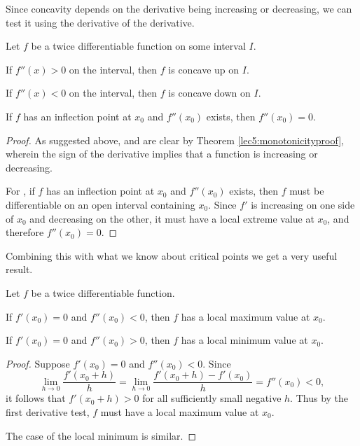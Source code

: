 \noindent
Since concavity depends on the derivative being increasing or decreasing, we can test it using the derivative of the derivative.

\begin{theorem}
	Let $f$ be a twice differentiable function on some interval $I$.
	\begin{romanlist}
		\item If $f''(x) > 0$ on the interval, then $f$ is concave up on $I$.
		\item If $f''(x) < 0$ on the interval, then $f$ is concave down on $I$.
		\item If $f$ has an inflection point at $x_0$ and $f''(x_0)$ exists, then $f''(x_0) = 0$.
	\end{romanlist}
\end{theorem}

\begin{proof}
	As suggested above,  and  are clear by Theorem \ref{lec5:monotonicityproof}, wherein the sign of the derivative implies that a function is increasing or decreasing.

	For , if $f$ has an inflection point at $x_0$ and $f''(x_0)$ exists, then $f$ must be differentiable on an open interval containing $x_0$.
	Since $f'$ is increasing on one side of $x_0$ and decreasing on the other, it must have a local extreme value at $x_0$, and therefore $f''(x_0) = 0$.
\end{proof}

\noindent
Combining this with what we know about critical points we get a very useful result.

\begin{theorem}
	Let $f$ be a twice differentiable function.

	\begin{romanlist}
		\item If $f'(x_0) = 0$ and $f''(x_0) < 0$, then $f$ has a local maximum value at $x_0$.
		\item If $f'(x_0) = 0$ and $f''(x_0) > 0$, then $f$ has a local minimum value at $x_0$.
	\end{romanlist}
\end{theorem}

\begin{proof}
	Suppose $f'(x_0) = 0$ and $f''(x_0) < 0$.
	Since
	\[
		\lim_{h \to 0} \frac{f'(x_0 + h)}{h} = \lim_{h \to 0} \frac{f'(x_0 + h) - f'(x_0)}{h} = f''(x_0) < 0,
	\]
	it follows that $f'(x_0 + h) > 0$ for all sufficiently small negative $h$.
	Thus by the first derivative test, $f$ must have a local maximum value at $x_0$.

	The case of the local minimum is similar.
\end{proof}

